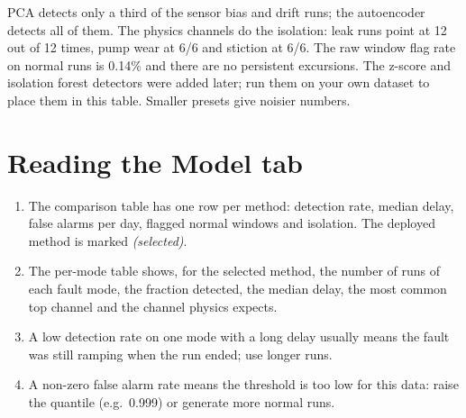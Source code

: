 PCA detects only a third of the sensor bias and drift runs; the autoencoder
detects all of them. The physics channels do the isolation: leak runs point at
 12 out of 12 times, pump wear at  6/6
and stiction at  6/6. The raw window flag rate on normal runs
is 0.14\% and there are no persistent excursions. The z-score and isolation
forest detectors were added later; run them on your own dataset to place them
in this table. Smaller presets give noisier numbers.

\section{Reading the Model tab}

\begin{enumerate}
  \item The comparison table has one row per method: detection rate, median
        delay, false alarms per day, flagged normal windows and isolation.
        The deployed method is marked \emph{(selected)}.
  \item The per-mode table shows, for the selected method, the number of runs
        of each fault mode, the fraction detected, the median delay, the most
        common top channel and the channel physics expects.
  \item A low detection rate on one mode with a long delay usually means the
        fault was still ramping when the run ended; use longer runs.
  \item A non-zero false alarm rate means the threshold is too low for this
        data: raise the quantile (e.g.\ 0.999) or generate more normal runs.
\end{enumerate}
